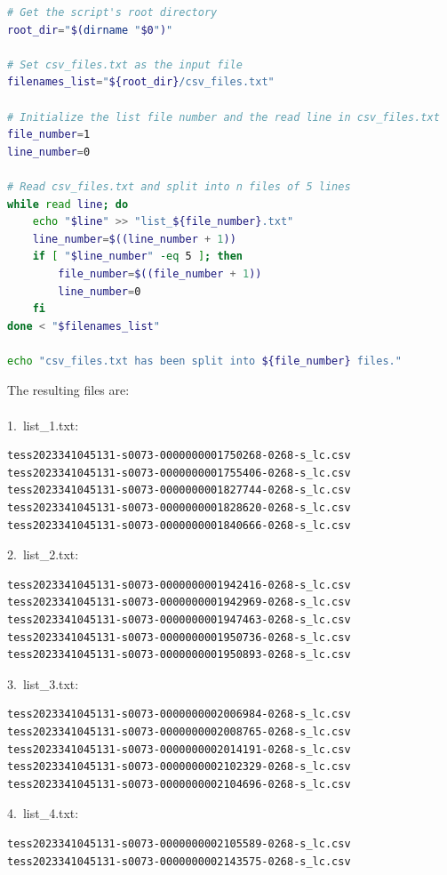 \documentclass[a4paper,12pt]{article}
\newenvironment{solution}{}{}
\begin{document}
\begin{enumerate}
\begin{solution}
\begin{lstlisting}[language=bash]
# Get the script's root directory
root_dir="$(dirname "$0")"

# Set csv_files.txt as the input file
filenames_list="${root_dir}/csv_files.txt"

# Initialize the list file number and the read line in csv_files.txt
file_number=1
line_number=0

# Read csv_files.txt and split into n files of 5 lines
while read line; do
    echo "$line" >> "list_${file_number}.txt"
    line_number=$((line_number + 1))
    if [ "$line_number" -eq 5 ]; then
        file_number=$((file_number + 1))
        line_number=0
    fi
done < "$filenames_list"

echo "csv_files.txt has been split into ${file_number} files."\end{lstlisting}
  \vspace{1em}The resulting files are:\\\\
  1.\ list\_1.txt:\\
  \begin{lstlisting}[language=bash]
tess2023341045131-s0073-0000000001750268-0268-s_lc.csv
tess2023341045131-s0073-0000000001755406-0268-s_lc.csv
tess2023341045131-s0073-0000000001827744-0268-s_lc.csv
tess2023341045131-s0073-0000000001828620-0268-s_lc.csv
tess2023341045131-s0073-0000000001840666-0268-s_lc.csv\end{lstlisting}
  2.\ list\_2.txt:\\
  \begin{lstlisting}[language=bash]
tess2023341045131-s0073-0000000001942416-0268-s_lc.csv
tess2023341045131-s0073-0000000001942969-0268-s_lc.csv
tess2023341045131-s0073-0000000001947463-0268-s_lc.csv
tess2023341045131-s0073-0000000001950736-0268-s_lc.csv
tess2023341045131-s0073-0000000001950893-0268-s_lc.csv\end{lstlisting}
  3.\ list\_3.txt:\\
  \begin{lstlisting}[language=bash]
tess2023341045131-s0073-0000000002006984-0268-s_lc.csv
tess2023341045131-s0073-0000000002008765-0268-s_lc.csv
tess2023341045131-s0073-0000000002014191-0268-s_lc.csv
tess2023341045131-s0073-0000000002102329-0268-s_lc.csv
tess2023341045131-s0073-0000000002104696-0268-s_lc.csv\end{lstlisting}
  4.\ list\_4.txt:\\
  \begin{lstlisting}[language=bash]
tess2023341045131-s0073-0000000002105589-0268-s_lc.csv
tess2023341045131-s0073-0000000002143575-0268-s_lc.csv

\end{lstlisting}
\end{solution}
\end{enumerate}
\end{document}

